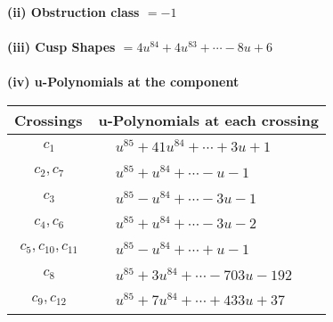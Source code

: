 \documentclass[1p]{elsarticle_modified}
\theoremstyle{definition}
\begin{document}
\flushleft \textbf{(ii) Obstruction class $= -1$}\\~\\
\flushleft \textbf{(iii) Cusp Shapes $= 4 u^{84}+4 u^{83}+\cdots-8 u+6$}\\~\\
\newpage\renewcommand{\arraystretch}{1}
\flushleft \textbf{(iv) u-Polynomials at the component}\newline \\
\begin{tabular}{m{50pt}|m{274pt}}
Crossings & \hspace{64pt}u-Polynomials at each crossing \\
\hline $$\begin{aligned}c_{1}\end{aligned}$$&$\begin{aligned}
&u^{85}+41 u^{84}+\cdots+3 u+1
\end{aligned}$\\
\hline $$\begin{aligned}c_{2},c_{7}\end{aligned}$$&$\begin{aligned}
&u^{85}+u^{84}+\cdots- u-1
\end{aligned}$\\
\hline $$\begin{aligned}c_{3}\end{aligned}$$&$\begin{aligned}
&u^{85}- u^{84}+\cdots-3 u-1
\end{aligned}$\\
\hline $$\begin{aligned}c_{4},c_{6}\end{aligned}$$&$\begin{aligned}
&u^{85}+u^{84}+\cdots-3 u-2
\end{aligned}$\\
\hline $$\begin{aligned}c_{5},c_{10},c_{11}\end{aligned}$$&$\begin{aligned}
&u^{85}- u^{84}+\cdots+u-1
\end{aligned}$\\
\hline $$\begin{aligned}c_{8}\end{aligned}$$&$\begin{aligned}
&u^{85}+3 u^{84}+\cdots-703 u-192
\end{aligned}$\\
\hline $$\begin{aligned}c_{9},c_{12}\end{aligned}$$&$\begin{aligned}
&u^{85}+7 u^{84}+\cdots+433 u+37
\end{aligned}$\\
\hline
\end{tabular}\\~\\
\end{document}
